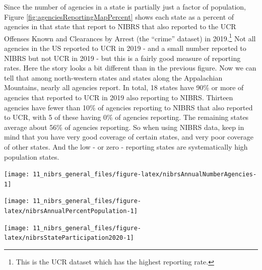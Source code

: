 \documentclass[
]{krantz}
\let\origfigure\figure
\let\endorigfigure\endfigure
\renewenvironment{figure}[1][2] {
    \expandafter\origfigure\expandafter[H]
} {
    \endorigfigure
}
\begin{document}
Since the number of agencies in a state is partially just a
factor of population, Figure
\ref{fig:agenciesReportingMapPercent} shows each state as a
percent of agencies in that state that report to NIBRS that
also reported to the UCR Offenses Known and Clearances by
Arrest (the ``crime'' dataset) in 2019.\footnote{This is the
  UCR dataset which has the highest reporting rate.} Not all
agencies in the US reported to UCR in 2019 - and a small
number reported to NIBRS but not UCR in 2019 - but this is a
fairly good measure of reporting rates. Here the story looks
a bit different than in the previous figure. Now we can tell
that among north-western states and states along the
Appalachian Mountains, nearly all agencies report. In total,
18 states have 90\% or more of agencies that reported to UCR
in 2019 also reporting to NIBRS. Thirteen agencies have
fewer than 10\% of agencies reporting to NIBRS that also
reported to UCR, with 5 of these having 0\% of agencies
reporting. The remaining states average about 56\% of
agencies reporting. So when using NIBRS data, keep in mind
that you have very good coverage of certain states, and very
poor coverage of other states. And the low - or zero -
reporting states are systematically high population states.

\begin{figure}

{\centering \texttt{[image: 11\_nibrs\_general\_files/figure-latex/nibrsAnnualNumberAgencies-1]} 

}

\caption{The annual number of police agencies that report data to NIBRS.}\label{fig:nibrsAnnualNumberAgencies}
\end{figure}

\begin{figure}

{\centering \texttt{[image: 11\_nibrs\_general\_files/figure-latex/nibrsAnnualPercentPopulation-1]} 

}

\caption{The annual percent of the United States population that is covered by an agency reporting data to NIBRS.}\label{fig:nibrsAnnualPercentPopulation}
\end{figure}

\begin{figure}

{\centering \texttt{[image: 11\_nibrs\_general\_files/figure-latex/nibrsStateParticipation2020-1]} 

}

\caption{The percent of each state's population that is covered by police agencies reporting at least one month of data to NIBRS.}\label{fig:nibrsStateParticipation2020}
\end{figure}
\end{document}
